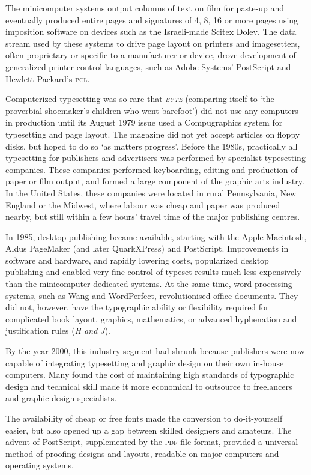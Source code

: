\documentclass{slipbox}
\begin{document}
\begin{slip}
    The minicomputer systems output columns of text on film for paste-up and eventually produced entire pages and signatures of 4, 8, 16 or more pages using imposition software on devices such as the Israeli-made Scitex Dolev. The data stream used by these systems to drive page layout on printers and imagesetters, often proprietary or specific to a manufacturer or device, drove development of generalized printer control languages, such as Adobe Systems' PostScript and Hewlett-Packard's \textsc{pcl}.

    Computerized typesetting was so rare that \textsc{\emph{byte}} (comparing itself to `the proverbial shoemaker's children who went barefoot') did not use any computers in production until its August 1979 issue used a Compugraphics system for typesetting and page layout. The magazine did not yet accept articles on floppy disks, but hoped to do so `as matters progress'. Before the 1980s, practically all typesetting for publishers and advertisers was performed by specialist typesetting companies. These companies performed keyboarding, editing and production of paper or film output, and formed a large component of the graphic arts industry. In the United States, these companies were located in rural Pennsylvania, New England or the Midwest, where labour was cheap and paper was produced nearby, but still within a few hours' travel time of the major publishing centres.

    In 1985, desktop publishing became available, starting with the Apple Macintosh, Aldus PageMaker (and later QuarkXPress) and PostScript. Improvements in software and hardware, and rapidly lowering costs, popularized desktop publishing and enabled very fine control of typeset results much less expensively than the minicomputer dedicated systems. At the same time, word processing systems, such as Wang and WordPerfect, revolutionised office documents. They did not, however, have the typographic ability or flexibility required for complicated book layout, graphics, mathematics, or advanced hyphenation and justification rules (\emph{H and J}).

    By the year 2000, this industry segment had shrunk because publishers were now capable of integrating typesetting and graphic design on their own in-house computers. Many found the cost of maintaining high standards of typographic design and technical skill made it more economical to outsource to freelancers and graphic design specialists.

    The availability of cheap or free fonts made the conversion to do-it-yourself easier, but also opened up a gap between skilled designers and amateurs. The advent of PostScript, supplemented by the \textsc{pdf} file format, provided a universal method of proofing designs and layouts, readable on major computers and operating systems.


\end{slip}
\end{document}
